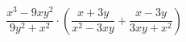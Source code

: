 \begin{ex}[type=expression]
	\begin{condition}
		\( \dfrac{x^3-9xy^2}{9y^2+x^2}\cdot\left( \dfrac{x+3y}{x^2-3xy}+\dfrac{x-3y}{3xy+x^2}\right) \)
	\end{condition}
\end{ex}